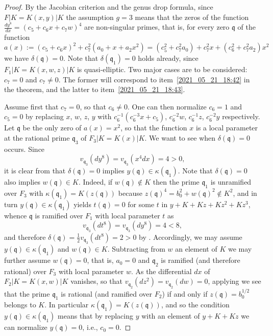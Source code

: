 \documentclass[12pt,reqno]{amsart}
\newcommand{\todoo}[2][]{\todo[size=tiny, #1]{#2}} %
\newcommand{\toda}[2][]{\todo[color=blue!30, #1]{#2}} %
\theoremstyle{definition}
\newcommand{\pp}{\mathfrak{p}}
\newcommand{\fq}{\mathfrak{q}}
\newcommand{\de}{\delta}
\newcommand{\ka}{\kappa}
\begin{document}
\begin{proof}
By the Jacobian criterion and the genus drop formula, since $F|K=K(x,y)|K$
the assumption $g=3$ means that the zeros of the function
$\frac{dy^8}{dx} = (c_5 + c_6 x + c_7 w)^4$
are non-singular primes, that is, for every zero $\fq$ of the function
\[ 
a(x) := (c_5 + c_6 x)^2 + c_7^2 (a_0 + x + a_2 x^2 ) 
= (c_5^2 + c_7^2 a_0) + c_7^2 x + (c_6^2 + c_7^2 a_2)x^2 
\]
we have $\de(\fq)=0$. 
Note that $\de(\fq_1)=0$ holds already, since $F_1|K=K(x,w,z)|K$ is quasi-elliptic.
Two major cases are to be considered: $c_7 = 0$ and $c_7\neq 0$.
The former will correspond to item~\ref{2021_05_21_18:42} in the theorem, and the latter to item~\ref{2021_05_21_18:43}.


Assume first that $c_7 = 0$, so that $c_6 \neq 0$. 
One can then normalize $c_6 = 1$ and $c_5 = 0$ by replacing $x$, $w$, $z$, $y$ with 
$c_6^{-1} (c_6^{-3} x + c_5)$, $c_6^{-2}w$, 
$c_6^{-1} z$, $c_6^{-2} y$ respectively. 
Let $\fq$ be the only zero of $a(x) = x^2$, so that the function $x$ is a local parameter at the rational prime $\fq_3$ of $F_3|K = K(x)|K$. 
We want to see when $\de(\fq) = 0$ occurs. 
Since
\[ v_{\fq_3}(dy^8) = v_{\fq_3}(x^4 dx) = 4 > 0, \]
it is clear from \cite[Theorem~2.3]{BedSt87} that $\de(\fq)=0$ implies $y(\fq) \in \ka({\fq_1})$. 
Note that $\de(\fq)=0$ also implies $w(\fq) \in K$. 
Indeed, if $w(\fq) \notin K$
then the prime $\fq_1$ is unramified over $F_3$ with $\ka(\fq_1)=K(z(\fq))$ because $z(\fq)^4 = b_0^2 + w(\fq)^2 \notin K^2$, and in turn $y(\fq) \in \ka(\fq_1)$ yields $t(\fq) = 0$ for some $t$ in $y + K + Kz + Kz^2 + Kz^3$, whence $\fq$ is ramified over $F_1$ with local parameter $t$ as
\[ v_{\fq_3}(dt^8) = v_{\fq_3}(dy^8) = 4 < 8, \]
and therefore $\de(\fq) = \frac12 v_{\fq_3}(dt^8) = 2 > 0$ by \cite[Theorem~2.3]{BedSt87}.
Accordingly, we may assume $y(\fq) \in \ka(\fq_1)$ and $w(\fq) \in K$.
Subtracting from $w$ an element of $K$ we may further assume $w(\fq)=0$, that is, $a_0=0$ and $\fq_2$ is ramified (and therefore rational) over $F_3$ with local parameter $w$.
As the differential $dx$ of $F_2|K=K(x,w)|K$ vanishes, so that $v_{\fq_2} (d z^2) = v_{\fq_2}(d w) = 0$, applying \cite[Proposition~4.1]{BedSt87} we see that the prime $\fq_1$ is rational (and ramified over $F_2$) if and only if $z(\fq) = b_0^{1/2}$ belongs to $K$.
In particular $\ka({\fq_1}) = K(z(\fq))$, and so the condition $y(\fq) \in \ka({\fq_1})$ means that by replacing $y$ with an element of $y + K + Kz$ we can normalize $y(\fq) = 0$, i.e., $c_0 = 0$.


\end{proof}
\end{document}
